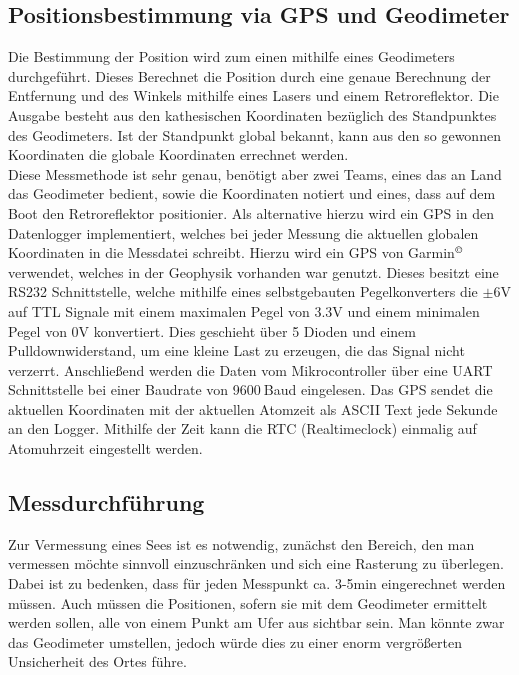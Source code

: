 \documentclass[12pt,a4paper,titlepage,headinclude,bibtotoc]{scrartcl}
\begin{document}
\subsection{Positionsbestimmung via GPS und Geodimeter}
Die Bestimmung der Position wird zum einen mithilfe eines Geodimeters durchgeführt.
Dieses Berechnet die Position durch eine genaue Berechnung der Entfernung und des Winkels mithilfe eines Lasers und einem Retroreflektor.
Die Ausgabe besteht aus den kathesischen Koordinaten bezüglich des Standpunktes des Geodimeters.
Ist der Standpunkt global bekannt, kann aus den so gewonnen Koordinaten die globale Koordinaten errechnet werden.\\
Diese Messmethode ist sehr genau, benötigt aber zwei Teams, eines das an Land das Geodimeter bedient, sowie die Koordinaten notiert und eines, dass auf dem Boot den Retroreflektor positionier.
Als alternative hierzu wird ein GPS in den Datenlogger implementiert, welches bei jeder Messung die aktuellen globalen Koordinaten in die Messdatei schreibt.
Hierzu wird ein GPS von Garmin$^{\copyright}$ verwendet, welches in der Geophysik vorhanden war genutzt.
Dieses besitzt eine RS232 Schnittstelle, welche mithilfe eines selbstgebauten Pegelkonverters die $\pm6\si{\volt}$ auf TTL Signale mit einem maximalen Pegel von 3.3\si{\volt} und einem minimalen Pegel von 0\si{\volt} konvertiert.
Dies geschieht über 5 Dioden und einem Pulldownwiderstand, um eine kleine Last zu erzeugen, die das Signal nicht verzerrt.
Anschließend werden die Daten vom Mikrocontroller über eine UART Schnittstelle bei einer Baudrate von 9600$~$Baud eingelesen.
Das GPS sendet die aktuellen Koordinaten mit der aktuellen Atomzeit als ASCII Text jede Sekunde an den Logger.
Mithilfe der Zeit kann die RTC (Realtimeclock) einmalig auf Atomuhrzeit eingestellt werden.

\subsection{Messdurchführung}

Zur Vermessung eines Sees ist es notwendig, zunächst den Bereich, den man vermessen möchte sinnvoll einzuschränken und sich eine Rasterung zu überlegen.
Dabei ist zu bedenken, dass für jeden Messpunkt ca. 3-5min eingerechnet werden müssen.
Auch müssen die Positionen, sofern sie mit dem Geodimeter ermittelt werden sollen, alle von einem Punkt am Ufer aus sichtbar sein.
Man könnte zwar das Geodimeter umstellen, jedoch würde dies zu einer enorm vergrößerten Unsicherheit des Ortes führe.
\end{document}

